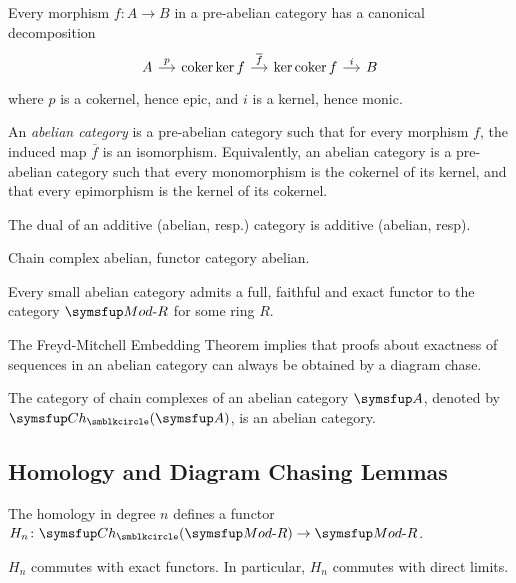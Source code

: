 \begin{proposition}
  Every morphism $f\colon A\to B$ in a pre-abelian category has a canonical decomposition
  \begin{equation*}
    \begin{tikzcd}[sep=small]
      A & \COKER\KER f & \KER\COKER f & B
      \arrow[from=1-1,]{1-2}[]{p}
      \arrow[from=1-2,]{1-3}[]{\overline{f}}
      \arrow[from=1-3,]{1-4}[]{i}
    \end{tikzcd}
  \end{equation*}
  where $p$ is a cokernel, hence epic, and $i$ is a kernel, hence monic.
\end{proposition}

An \emph{abelian category} is a pre-abelian category such that for every morphism $f$, the induced map $\overline{f}$ is an isomorphism. Equivalently, an abelian category is a pre-abelian category such that every monomorphism is the cokernel of its kernel, and that every epimorphism is the kernel of its cokernel.

\begin{remark}
  The dual of an additive (abelian, resp.) category is additive (abelian, resp).
\end{remark}

Chain complex abelian, functor category abelian.

\begin{theorem}
  Every small abelian category admits a full, faithful and exact functor to the category $\MODR$ for some ring $R$.
\end{theorem}

The Freyd-Mitchell Embedding Theorem implies that proofs about exactness of sequences in an abelian category can always be obtained by a diagram chase.

The category of chain complexes of an abelian category $\CAT{A}$, denoted by $\CH(\CAT{A})$, is an abelian category.

\subsection{Homology and Diagram Chasing Lemmas}

The homology in degree $n$ defines a functor $H_n\colon\CH(\MODR)\to\MODR$.

\begin{proposition}
  $H_n$ commutes with exact functors. In particular, $H_n$ commutes with direct limits.
\end{proposition}

